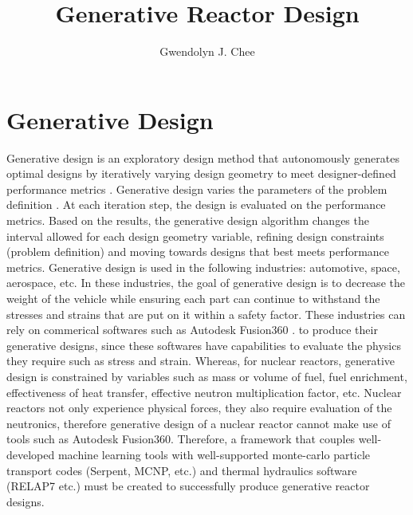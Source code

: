 \documentclass[letterpaper,11pt]{article}
\author{Gwendolyn J. Chee}
\title{Generative Reactor Design}
\begin{document}
\maketitle
\hrulefill
\onehalfspacing

\section{Generative Design}
Generative design is an exploratory design method that autonomously 
generates optimal designs by iteratively varying design geometry 
to meet designer-defined performance metrics \cite{krish_practical_2011,oh_deep_2019}. 
Generative design varies the parameters of the problem definition
\cite{matejka_dream_2018}. 
At each iteration step, the design is evaluated on the 
performance metrics. 
Based on the results, the generative design algorithm changes the 
interval allowed for each design geometry variable, refining 
design constraints (problem definition) and moving towards 
designs that best meets performance metrics. 
Generative design is used in the following industries: 
automotive, space, aerospace, etc. 
In these industries, the goal of generative design is to decrease 
the weight of the vehicle while ensuring each part can continue to 
withstand the stresses and strains that are put on it within a 
safety factor. 
These industries can rely on commerical softwares such as 
Autodesk Fusion360 \cite{autodesk_autodesk_2020}.
to produce their generative designs, since these softwares have 
capabilities to evaluate the physics they require such as stress 
and strain. 
Whereas, for nuclear reactors, generative design is constrained by 
variables such as mass or volume of fuel, fuel enrichment, effectiveness 
of heat transfer, effective neutron multiplication factor, etc. 
Nuclear reactors not only experience physical forces, they also
require evaluation of the neutronics, therefore generative design of 
a nuclear reactor cannot make use of tools such as Autodesk Fusion360. 
Therefore, a framework that couples well-developed machine 
learning tools with well-supported monte-carlo particle transport 
codes (Serpent, MCNP, etc.) and thermal hydraulics software (RELAP7 etc.)
must be created to successfully produce generative reactor designs. 





\end{document}

